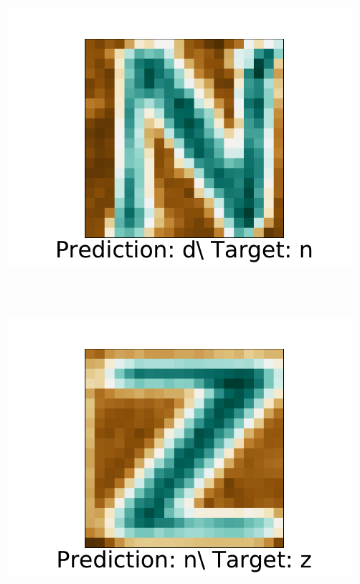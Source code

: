 \documentclass[../main.tex]{subfiles}
\begin{document}
\begin{figure}
    \centering
    \begin{subfigure}[t]{0.15\textwidth}
        \includegraphics[width=\textwidth]{figures/ex/n_0.pdf}
        \label{fig:gull}
    \end{subfigure}
    ~ 
    \begin{subfigure}[t]{0.15\textwidth}
        \includegraphics[width=\textwidth]{figures/ex/n_1.pdf}
        \label{fig:gull}
    \end{subfigure}
    ~ 
    \begin{subfigure}[t]{0.15\textwidth}

\end{subfigure}
\end{figure}
\end{document}
